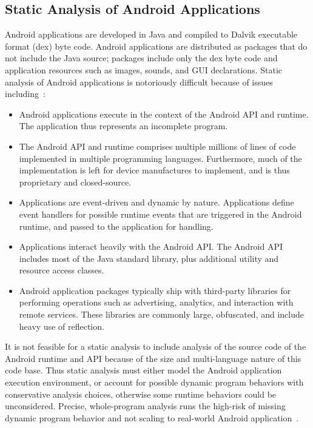 \subsection{Static Analysis of Android Applications}

Android applications are developed in Java and compiled to Dalvik
executable format (dex) byte code.  Android applications are
distributed as packages that do not include the Java source; packages
include only the dex byte code and application resources such as
images, sounds, and GUI declarations.  Static analysis of Android
applications is notoriously difficult because of issues
including~\cite{Gordon:Kim:Perkins:Gilham:Nguyen:Rinard:NDSS15}:

\begin{itemize}[leftmargin=0.5cm]

\item Android applications execute in the context of the Android API
  and runtime.  The application thus represents an incomplete program.
  
\item The Android API and runtime comprises multiple millions of lines of
  code implemented in multiple programming languages.  Furthermore,
  much of the implementation is left for device manufactures to
  implement, and is thus proprietary and closed-source. 

\item Applications are event-driven and dynamic by nature.
  Applications define event handlers for possible runtime events that
  are triggered in the Android runtime, and passed to the application
  for handling. 

\item Applications interact heavily with the Android API.  The Android
  API includes most of the Java standard library, plus additional
  utility and resource access classes.

\item Android application packages typically ship with third-party
  libraries for performing operations such as advertising, analytics,
  and interaction with remote services.  These libraries are commonly
  large, obfuscated, and include heavy use of reflection.

\end{itemize}

It is not feasible for a static analysis to include analysis of the
source code of the Android runtime and API because of the size and
multi-language nature of this code base.  Thus static analysis must
either model the Android application execution environment, or account
for possible dynamic program behaviors with conservative analysis
choices, otherwise some runtime behaviors could be unconsidered.
Precise, whole-program analysis runs the high-risk of missing dynamic
program behavior and not scaling to real-world Android
application~\cite{Gordon:Kim:Perkins:Gilham:Nguyen:Rinard:NDSS15}.

